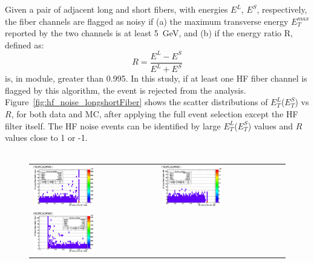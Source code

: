\begin{itemize}
Given a pair of adjacent long and short 
fibers, with energies $E^L$, $E^S$, respectively, the fiber channels are flagged as noisy if 
(a) the maximum transverse energy $E_T^{max}$ reported by the two channels is at least 5~GeV, and (b) 
if the energy ratio R, defined as:
%
\begin{equation}
R = \frac{E^L - E^S}{E^L + E^S}
\end{equation}
%
is, in module, greater than 0.995. In this study, if at least one HF fiber channel 
is flagged by this algorithm, the event is rejected from the analysis. 
Figure~\ref{fig:hf_noise_longshortFiber} shows the scatter distributions of $E_T^L$($E_T^S$) vs $R$, 
for both data and MC, after applying the full event selection except the HF filter itself.
The HF noise events can be identified by large $E_T^L$($E_T^S$) values and $R$ values close to 1 or -1.
\\
\\
%
%
\begin{figure}[h!]
 \centering
 \begin{tabular}{ll}
  \includegraphics[width=0.5\textwidth]{plots_hcalnoise/hf_longfiberET_vs_ratio_DATA.eps} &
  \includegraphics[width=0.5\textwidth]{plots_hcalnoise/hf_longfiberET_vs_ratio_MC.eps} \\
  \includegraphics[width=0.5\textwidth]{plots_hcalnoise/hf_shortfiberET_vs_ratio_DATA.eps} &

\end{tabular}
\end{figure}
\end{itemize}
